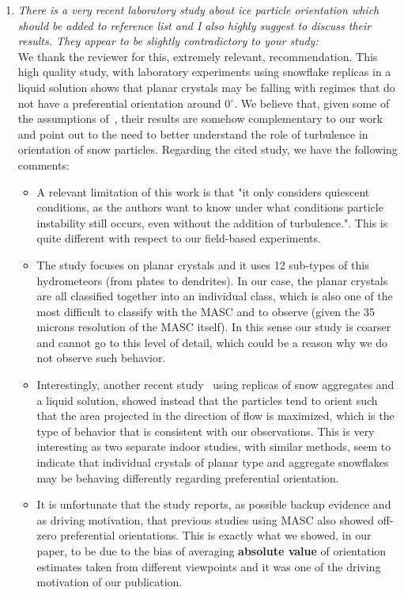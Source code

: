 \documentclass[12pt]{article}
\begin{document}
\begin{enumerate}
    
    \item \textit{There is a very recent laboratory study about ice particle orientation which should be added to reference list and I also highly suggest to discuss their results. They appear to be slightly contradictory to your study:} \cite{Stout_ACP_2024} \\

    We thank the reviewer for this, extremely relevant, recommendation.  This high quality study, with laboratory experiments using snowflake replicas in a liquid solution shows that planar crystals may be falling with regimes that do not have a preferential orientation around 0$^\circ$. We believe that, given some of the assumptions of~\cite{Stout_ACP_2024}, their results are somehow complementary to our work and point out to the need to better understand the role of turbulence in orientation of snow particles. Regarding the cited study, we have the following comments:
    \begin{itemize}
        \item A relevant limitation of this work is that "it  only considers quiescent conditions, as the authors want to know under what conditions particle instability still occurs, even without the addition of turbulence.". This is quite different with respect to our field-based experiments.
        \item The study focuses on planar crystals and it uses 12 sub-types of this  hydrometeors (from plates to dendrites). In our case, the planar crystals are all classified together into an individual class, which is also one of the most difficult to classify with the MASC and to observe (given the 35 microns resolution of the MASC itself). In this sense our study is coarser and cannot go to this level of detail, which could be a reason why we do not observe such behavior. 
        \item Interestingly, another recent study~\cite{Koebschall_EF_2023} using replicas of snow aggregates and a liquid solution, showed instead that the particles tend to orient such that the area projected in the direction of flow is maximized, which is the type of behavior that is consistent with our observations. This is very interesting as two separate indoor studies, with similar methods, seem to indicate that individual crystals of planar type and aggregate snowflakes may be behaving differently regarding preferential orientation.
        \item It is unfortunate that the study reports, as possible backup evidence and as driving motivation, that previous studies using MASC also showed off-zero preferential orientations. This is exactly what we showed, in our paper, to be due to the bias of averaging \textbf{absolute value} of orientation estimates taken from different viewpoints and it was one of the driving motivation of our publication.  
    \end{itemize}


\end{enumerate}
\end{document}
